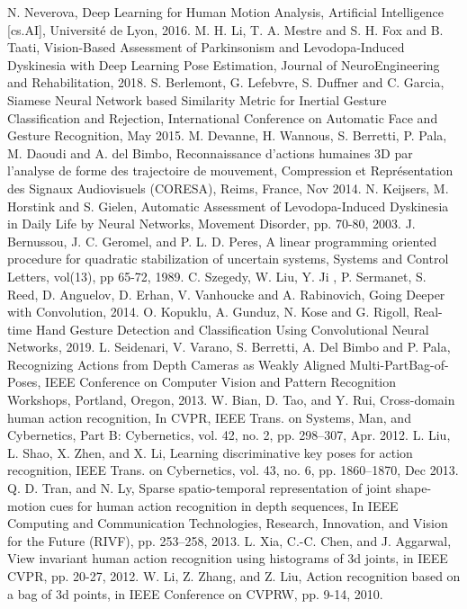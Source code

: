 \documentclass[letterpaper, 10 pt, conference]{ieeeconf}  %
\begin{document}
\begin{thebibliography}{99}

 N. Neverova, Deep Learning for Human Motion Analysis, Artificial Intelligence [cs.AI], Universit\'e de Lyon, 2016.
 M. H. Li, T. A. Mestre and S. H. Fox and B. Taati, Vision-Based Assessment of Parkinsonism and Levodopa-Induced Dyskinesia with Deep Learning Pose Estimation, Journal of NeuroEngineering and Rehabilitation, 2018.
 S. Berlemont, G. Lefebvre, S. Duffner and C. Garcia, Siamese Neural Network based Similarity Metric for Inertial Gesture Classification and Rejection, International Conference on Automatic Face and Gesture Recognition, May 2015.
 M. Devanne, H. Wannous, S. Berretti, P. Pala,  M. Daoudi and A. del Bimbo, Reconnaissance d'actions humaines 3D par l'analyse de forme des trajectoire de mouvement, Compression et Repr\'esentation des Signaux Audiovisuels (CORESA), Reims, France, Nov 2014.
 N. Keijsers, M. Horstink and S. Gielen, Automatic Assessment of Levodopa-Induced Dyskinesia in Daily Life by Neural Networks, Movement Disorder, pp. 70-80, 2003.
 J. Bernussou, J. C. Geromel, and P. L. D. Peres, A linear programming oriented procedure for quadratic stabilization of uncertain systems, Systems and Control Letters, vol(13), pp 65-72, 1989.
 C. Szegedy, W. Liu, Y. Ji , P. Sermanet, S. Reed, D. Anguelov, D. Erhan, V. Vanhoucke and A. Rabinovich, Going Deeper with Convolution, 2014.
 O. Kopuklu, A. Gunduz, N. Kose and G. Rigoll, Real-time Hand Gesture Detection and Classification Using Convolutional Neural Networks, 2019.
 L. Seidenari, V. Varano, S. Berretti, A. Del Bimbo and P. Pala, Recognizing Actions from Depth Cameras as Weakly Aligned Multi-PartBag-of-Poses, IEEE Conference on Computer Vision and Pattern Recognition Workshops, Portland, Oregon, 2013.
 W. Bian, D. Tao, and Y. Rui, Cross-domain human action recognition, In CVPR, IEEE Trans. on Systems, Man, and Cybernetics, Part B: Cybernetics, vol. 42, no. 2, pp. 298–307, Apr. 2012.
 L. Liu, L. Shao, X. Zhen, and X. Li, Learning discriminative key poses for action recognition, IEEE Trans. on Cybernetics, vol. 43, no. 6, pp. 1860–1870, Dec 2013.
 Q. D. Tran, and N. Ly, Sparse spatio-temporal
representation of joint shape-motion cues for human action
recognition in depth sequences, In IEEE Computing and Communication Technologies, Research, Innovation, and Vision for
the Future (RIVF), pp. 253–258, 2013.
 L. Xia, C.-C. Chen, and J. Aggarwal, View invariant
human action recognition using histograms of 3d joints, in IEEE CVPR, pp. 20-27, 2012.
 W. Li, Z. Zhang, and Z. Liu, Action recognition
based on a bag of 3d points, in IEEE Conference on CVPRW, pp. 9-14, 2010.



\end{thebibliography}
\end{document}
